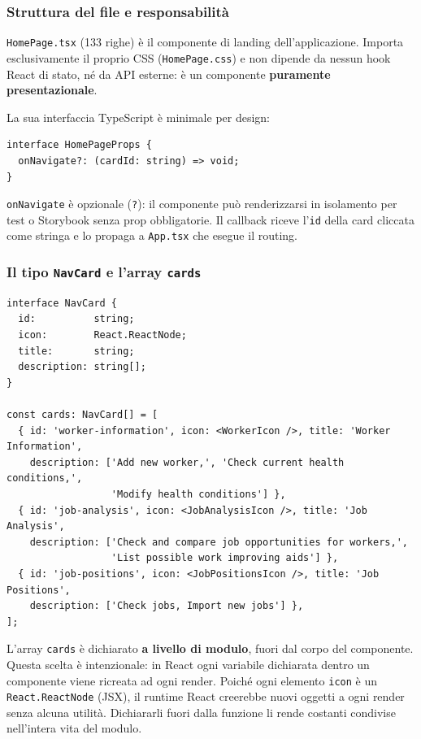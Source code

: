 \documentclass[a4paper,12pt]{article}
\begin{document}
\subsubsection{Struttura del file e responsabilit\`{a}}

\texttt{HomePage.tsx} (133 righe) \`{e} il componente di landing
dell'applicazione. Importa esclusivamente il proprio CSS
(\texttt{HomePage.css}) e non dipende da nessun hook React di stato,
n\'{e} da API esterne: \`{e} un componente \textbf{puramente presentazionale}.

La sua interfaccia TypeScript \`{e} minimale per design:

\begin{lstlisting}
interface HomePageProps {
  onNavigate?: (cardId: string) => void;
}
\end{lstlisting}

\noindent \texttt{onNavigate} \`{e} opzionale (\texttt{?}): il componente pu\`{o}
renderizzarsi in isolamento per test o Storybook senza prop obbligatorie.
Il callback riceve l'\texttt{id} della card cliccata come stringa e lo
propaga a \texttt{App.tsx} che esegue il routing.

\subsubsection{Il tipo \texttt{NavCard} e l'array \texttt{cards}}

\begin{lstlisting}
interface NavCard {
  id:          string;
  icon:        React.ReactNode;
  title:       string;
  description: string[];
}

const cards: NavCard[] = [
  { id: 'worker-information', icon: <WorkerIcon />, title: 'Worker Information',
    description: ['Add new worker,', 'Check current health conditions,',
                  'Modify health conditions'] },
  { id: 'job-analysis', icon: <JobAnalysisIcon />, title: 'Job Analysis',
    description: ['Check and compare job opportunities for workers,',
                  'List possible work improving aids'] },
  { id: 'job-positions', icon: <JobPositionsIcon />, title: 'Job Positions',
    description: ['Check jobs, Import new jobs'] },
];
\end{lstlisting}

\noindent L'array \texttt{cards} \`{e} dichiarato \textbf{a livello di modulo},
fuori dal corpo del componente. Questa scelta \`{e} intenzionale: in React
ogni variabile dichiarata dentro un componente viene ricreata ad ogni
render. Poich\'{e} ogni elemento \texttt{icon} \`{e} un
\texttt{React.ReactNode} (JSX), il runtime React creerebbe nuovi oggetti
a ogni render senza alcuna utilit\`{a}. Dichiararli fuori dalla funzione
li rende costanti condivise nell'intera vita del modulo.
\end{document}
